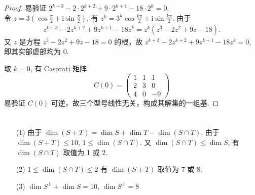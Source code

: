 \documentclass{article}
\begin{document}
\begin{proof}
    易验证 $2^{k + 3} - 2\cdot 2^{k + 2} + 9 \cdot 2^{k + 1} - 18 \cdot 2^k = 0$. \\
    令 $z = 3\left(\cos \frac{\pi}{2} + \mathrm{i} \sin\frac{\pi}{2}\right)$, 有 $z^k = 3^k \cos \frac{k\pi}{2} + \mathrm{i}\sin \frac{k\pi}{2}$.
    由于
    \begin{align*}
        z^{k + 3} - 2z^{k + 2} + 9 z^{k + 1} - 18z^{k} = z^{k}\left(z^3 - 2z^2 + 9z - 18\right).
    \end{align*}
    又 $z$ 是方程 $z^3 - 2z^2 + 9z - 18 = 0$ 的根，故 $z^{k + 3} - 2z^{k + 2} + 9 z^{k + 1} - 18z^{k} = 0$, 即其实部虚部均为 0.

    取 $k = 0$, 有 Casorati 矩阵 
    \[
        C(0) = \begin{pmatrix}
            1 & 1 & 1 \\
            2 & 3 & 0 \\
            4 & 0 & -9
        \end{pmatrix}
    \]
    易验证 $C(0)$ 可逆，故三个型号线性无关，构成其解集的一组基.
\end{proof}

\section{}

\begin{itemize}
    \item [(1)] 由于 $\dim(S + T) = \dim S + \dim T - \dim(S \cap T)$. 由于 $\dim (S + T) \leq 10$, $1 \leq \dim (S \cap T)$. 又 $\dim (S \cap T ) \leq \dim S$, 有 $\dim (S \cap T)$ 取值为 1 或 2.
    \item [(2)] $1 \leq \dim (S \cap T) \leq 2$ 有 $\dim (S + T)$ 取值为 7 或 8.
    \item [(3)] $\dim S^\bot + \dim S = 10$, $\dim S^\bot = 8$
\end{itemize}
\end{document}
